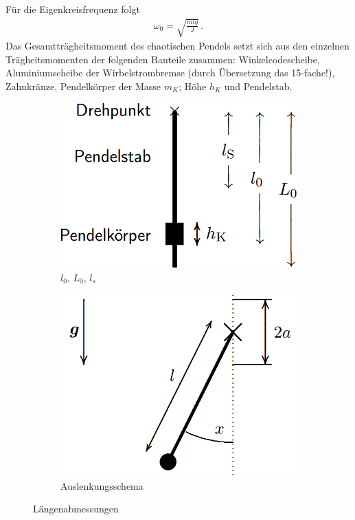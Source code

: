 \documentclass[numbers=noenddot,12pt,a4paper]{scrartcl}
\begin{document}
Für die Eigenkreisfrequenz folgt
\begin{align}
\omega_0=\sqrt{\frac{mlg}{J}} \, . \label{eq:freq}
\end{align}
Das Gesamtträgheitsmoment des chaotischen Pendels setzt sich aus den einzelnen Trägheitsmomenten der folgenden Bauteile zusammen: Winkelcodescheibe, Aluminiumscheibe der Wirbelstrombremse (durch Übersetzung das 15-fache!), Zahnkränze, Pendelkörper der Masse $m_K$; Höhe $h_K$ und Pendelstab.
\begin{figure}[H]
\centering
\begin{subfigure}[b]{0.3\textwidth}
\includegraphics[width=\textwidth]{lnull.png}
\caption{$l_0$, $L_0$, $l_s$} \label{img:lnull}
\end{subfigure}
\begin{subfigure}[b]{0.3\textwidth}
\includegraphics[width=\textwidth]{auslenkung.png}
\caption{Auslenkungsschema} \label{img:auslenkung}
\end{subfigure}
\caption{Längenabmessungen} \label{img:abmessungen}
\end{figure}
\end{document}
